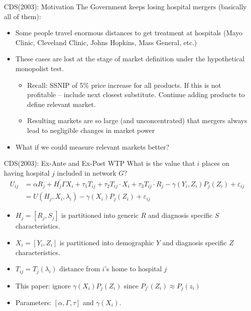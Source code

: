 \begin{frame}{CDS(2003): Motivation}
The Government keeps losing hospital mergers (basically all of them):
\begin{itemize}
\item Some people travel enormous distances to get treatment at hospitals (Mayo Clinic, Cleveland Clinic, Johns Hopkins, Mass General, etc.)
\item These cases are lost at the stage of \alert{market definition} under the \alert{hypothetical monopolist test}.
\begin{itemize}
\item Recall: SSNIP of 5\% price increase for all products. If this is not profitable -- include next closest substitute. Continue adding products to define relevant market.
\item Resulting markets are so large (and unconcentrated) that mergers always lead to negligible changes in market power
\end{itemize}
\item What if we could measure relevant markets better?
\end{itemize}
\end{frame} 


\begin{frame}{CDS(2003): Ex-Ante and Ex-Post WTP}
What is the value that $i$ places on having hospital $j$ included in network $G$?
\begin{align*}
U_{i j} &=\alpha R_{j}+H_{j}^{\prime} \Gamma X_{i}+\tau_{1} T_{i j}+\tau_{2} T_{i j} \cdot X_{i}+\tau_{3} T_{i j} \cdot R_{j}-\gamma\left(Y_{i}, Z_{i}\right) P_{j}\left(Z_{i}\right)+\varepsilon_{i j} \\ &=U\left(H_{j}, X_{i}, \lambda_{i}\right)-\gamma\left(X_{i}\right) P_{j}\left(Z_{i}\right)+\varepsilon_{i j} 
\end{align*}

\begin{itemize}
\item $H_{j}=\left[R_{j}, S_{j}\right]$ is partitioned into generic $R$ and diagnosis specific $S$ characteristics.
\item $X_{i}=\left[Y_{i}, Z_{i}\right]$ is partitioned into demographic $Y$ and diagnosis specific $Z$ characteristics.
\item $T_{i j}=T_{j}\left(\lambda_{i}\right)$ distance from $i$'s home to hospital $j$
\item This paper: ignore $\gamma\left(X_{i}\right) P_{j}\left(Z_{i}\right)$ since $P_{j'}(Z_i) \approx P_j(z_i)$
\item Parameters: $[\alpha,\Gamma, \tau]$ and $\gamma(X_i)$.
\end{itemize}
\end{frame} 


